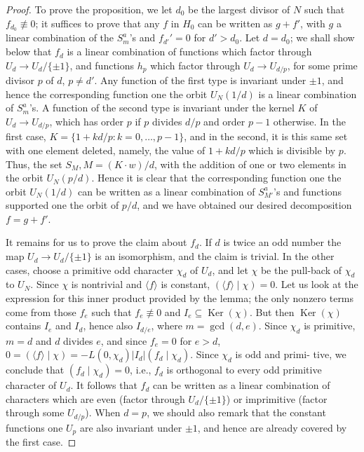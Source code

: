 \documentclass[12pt,a4paper]{article}
\theoremstyle{plain}
\theoremstyle{definition}
\theoremstyle{remark}
\DeclareMathOperator{\Ker}{Ker}
\begin{document}
\begin{proof}
To prove the proposition, we let $d_0$ be the largest divisor of $N$ such that
$f_{d_0} \not\equiv 0$; it suffices to prove that any $f$ in $H_0$ can be written as $g + f'$,
with $g$ a linear combination of the $S_m^a$'s and $f_{d'}' = 0$ for $d' > d_0$. Let
$d = d_0$; we shall show below that $f_d$ is a linear combination of functions which
factor through $U_d \to U_d/\{\pm 1\}$, and functions $h_p$ which factor through
$U_d \to U_{d/p}$, for some prime divisor $p$ of $d$, $p \neq d'$. Any function
of the first type is invariant under $\pm 1$, and hence the corresponding function one
the orbit $U_N(1/d)$ is a linear combination of $S_m^a$'s. A function of the second
type is invariant under the kernel $K$ of $U_d \to U_{d/p}$, which has order $p$ if
$p$ divides $d/p$ and order $p-1$ otherwise. In the first case,
$K = \{1 + kd/p: k = 0, \ldots, p-1\}$, and in
the second, it is this same set with one element deleted, namely, the value of
$1 + kd/p$ which is divisible by $p$. Thus, the set $S_{M}, M = (K \cdot w)/d$, with the
addition of one or two elements in the orbit $U_N(p/d)$. Hence it is clear that the
corresponding function one the orbit $U_N(1/d)$ can be written as a linear
combination of $S_{M'}^a$'s and functions supported one the orbit of $p/d$, and we
have obtained our desired decomposition $f = g + f'$.

It remains for us to prove the claim about $f_d$. If $d$ is twice an odd number the map
$U_d \to U_d/\{\pm 1\}$ is an isomorphism, and the claim is trivial. In the other
cases, choose a primitive odd character $\chi_d$ of $U_d$, and let $\chi$ be the pull-back
of $\chi_d$ to $U_N$. Since $\chi$ is nontrivial and $\langle f \rangle$ is constant, $(\langle f \rangle \mid \chi) = 0$.
Let us look at the expression for this inner product provided by the lemma; the
only nonzero terms come from those $f_e$ such that $f_e \not\equiv 0$ and $I_e \subseteq \Ker(\chi)$.
But then $\Ker(\chi)$ contains $I_e$ and $I_d$, hence also $I_{d/e}$, where $m = \gcd(d,e)$.
Since $\chi_d$ is primitive, $m = d$ and $d$ divides $e$, and since $f_e = 0$ for $e > d$,
$0 = (\langle f \rangle \mid \chi) = -L(0, \chi_d) |I_d| (f_d \mid \chi_d)$. Since $\chi_d$ is odd and primi-
tive, we conclude that $(f_d \mid \chi_d) = 0$, i.e., $f_d$ is orthogonal to every odd primitive
character of $U_d$. It follows that $f_d$ can be written as a linear combination of
characters which are even (factor through $U_d/\{\pm 1\}$) or imprimitive (factor
through some $U_{d/p}$). When $d = p$, we should also remark that the constant
functions one $U_p$ are also invariant under $\pm 1$, and hence are already covered
by the first case.
\end{proof}
\end{document}

